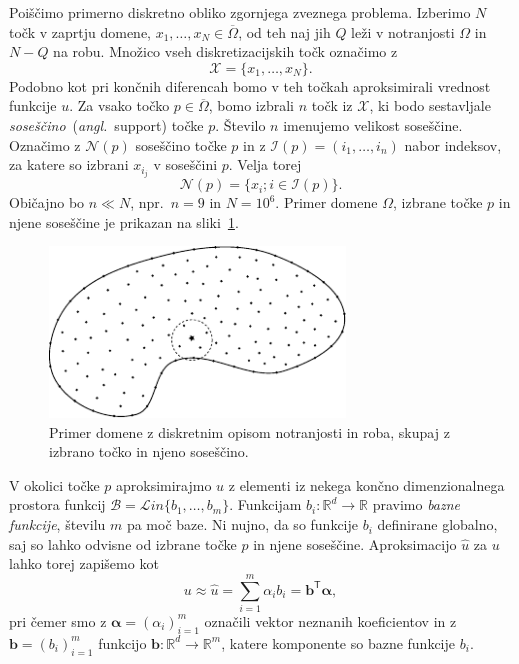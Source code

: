 \documentclass[12pt,a4paper,twoside]{article}
\theoremstyle{definition} %
\theoremstyle{plain} %
\numberwithin{equation}{section}
\newcommand{\R}{\mathbb R}
\newcommand{\Nc}{\mathcal{N}}
\newcommand{\I}{\mathcal{I}}
\newcommand{\B}{\mathcal{B}}
\newcommand{\T}{\mathsf{T}}
\newcommand{\X}{\mathcal{X}}
\renewcommand{\b}{\boldsymbol}
\newcommand{\zomega}{\overline{\Omega}}
\newcommand{\Lin}{\mathcal{L}in}
\newcommand{\uh}{\hat{u}}
\newcommand{\ang}[1]{(\hspace{-1.5px}\textit{angl.}\ #1)}
\begin{document}
Poiščimo primerno diskretno obliko zgornjega zveznega problema. Izberimo $N$ točk v zaprtju domene,
$x_1, \dots, x_N \in \zomega$, od teh naj jih $Q$ leži v notranjosti $\Omega$ in $N-Q$ na robu.
Množico vseh diskretizacijskih točk označimo z
\begin{equation}
  \X  = \{x_1, \dots, x_N\}.
\end{equation}
Podobno kot pri končnih diferencah bomo v teh točkah aproksimirali vrednost funkcije $u$. Za vsako
točko $p \in \zomega$, bomo izbrali $n$ točk iz $\X$, ki bodo sestavljale
\emph{soseščino}~\ang{support} točke $p$. Število $n$ imenujemo velikost soseščine. Označimo z
$\Nc(p)$ soseščino točke $p$ in z $\I(p) = (i_1, \dots, i_n)$ nabor indeksov, za katere so
izbrani $x_{i_j}$ v soseščini $p$. Velja torej
\begin{equation}
  \Nc(p) = \{x_i; i \in \I(p)\}.
\end{equation}
Običajno bo $n \ll N$, npr.~$n = 9$ in $N = 10^6$.
Primer domene $\Omega$, izbrane točke $p$ in njene soseščine je prikazan na
sliki~\ref{fig:domain-example}.

\begin{figure}[ht]
  \centering
  \includegraphics[width=0.7\textwidth]{images/domain_theoretical.pdf}
  \caption[Domena in diskretizacija notranjosti in roba.]{Primer domene z
  diskretnim opisom notranjosti in roba, skupaj z izbrano točko in njeno
soseščino.}
  \label{fig:domain-example}
\end{figure}

V okolici točke $p$ aproksimirajmo $u$ z elementi iz nekega končno dimenzionalnega prostora funkcij
$\B = \Lin\{b_1, \dots, b_m\}$.  Funkcijam $b_i\colon \R^d \to \R$ pravimo \emph{bazne funkcije},
številu $m$ pa moč baze. Ni nujno, da so funkcije $b_i$ definirane globalno, saj so lahko odvisne od
izbrane točke $p$ in njene soseščine.  Aproksimacijo $\uh$ za $u$ lahko torej zapišemo kot
\begin{equation}
  \label{eq:uhat-def}
   u \approx \uh = \sum_{i=1}^m \alpha_i b_i = \b{b}^\T \b{\alpha},
\end{equation}
pri čemer smo z $\b{\alpha} = (\alpha_i)_{i=1}^m$ označili vektor neznanih
koeficientov in z $\b{b} = (b_i)_{i=1}^m$ funkcijo $\b{b}\colon\R^d\to\R^m$, katere
komponente so bazne funkcije $b_i$.
\end{document}
